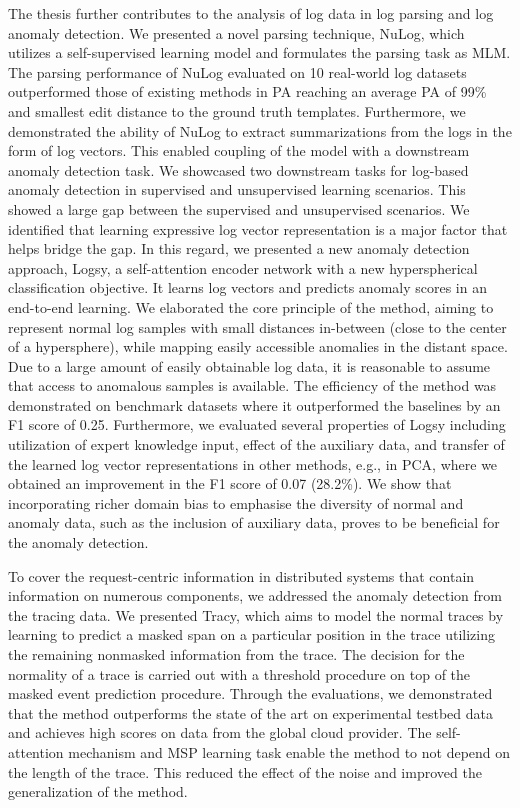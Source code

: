 The thesis further contributes to the analysis of log data in log parsing and log anomaly detection. We presented a novel parsing technique, NuLog, which utilizes a self-supervised learning model and formulates the parsing task as MLM. The parsing performance of NuLog evaluated on 10 real-world log datasets outperformed those of existing methods in PA reaching an average PA of 99\% and smallest edit distance to the ground truth templates. Furthermore, we demonstrated the ability of NuLog to extract summarizations from the logs in the form of log vectors. This enabled coupling of the model with a downstream anomaly detection task. We showcased two downstream tasks for log-based anomaly detection in supervised and unsupervised learning scenarios. This showed a large gap between the supervised and unsupervised scenarios. We identified that learning expressive log vector representation is a major factor that helps bridge the gap. In this regard, we presented a new anomaly detection approach, Logsy, a self-attention encoder network with a new hyperspherical classification objective. It learns log vectors and predicts anomaly scores in an end-to-end learning. We elaborated the core principle of the method, aiming to represent normal log samples with small distances in-between (close to the center of a hypersphere), while mapping easily accessible anomalies in the distant space. Due to a large amount of easily obtainable log data, it is reasonable to assume that access to  anomalous samples is available. The efficiency of the method was demonstrated on benchmark datasets where it outperformed the baselines by an F1 score of 0.25. Furthermore, we evaluated several properties of Logsy including utilization of expert knowledge input, effect of the auxiliary data, and transfer of the learned log vector representations in other methods, e.g., in PCA, where we obtained an improvement in the F1 score of 0.07 (28.2\%). We show that incorporating richer domain bias to emphasise the diversity of normal and anomaly data, such as the inclusion of auxiliary data, proves to be beneficial for the anomaly detection.

To cover the request-centric information in distributed systems that contain information on numerous components, we addressed the anomaly detection from the tracing data. We presented Tracy, which aims to model the normal traces by learning to predict a masked span on a particular position in the trace utilizing the remaining nonmasked information from the trace. The decision for the normality of a trace is carried out with a threshold procedure on top of the masked event prediction procedure. Through the evaluations, we demonstrated that the method outperforms the state of the art on experimental testbed data and achieves high scores on data from the global cloud provider. The self-attention mechanism and MSP learning task enable the method to not depend on the length of the trace. This reduced the effect of the noise and improved the generalization of the method.

